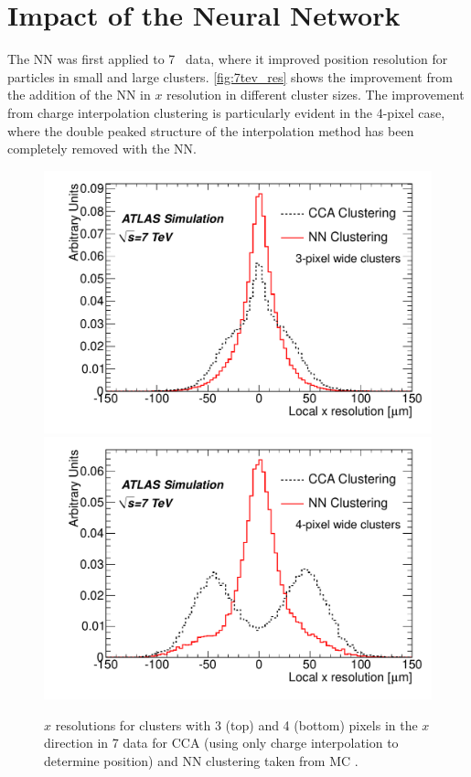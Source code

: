 \section{Impact of the Neural Network}

The \ac{NN} was first applied to 7 \tev~data, where it improved position resolution for particles in small and large clusters. \autoref{fig:7tev_res} shows the improvement from the addition of the \ac{NN} in $x$ resolution in different cluster sizes. The improvement from charge interpolation clustering is particularly evident in the 4-pixel case, where the double peaked structure of the interpolation method has been completely removed with the \ac{NN}.  

\begin{centering}
\begin{figure}[!htb]
\myfloatalign
\includegraphics[width=.9\linewidth]{figures/nn/3x_res.pdf}
\includegraphics[width=.9\linewidth]{figures/nn/4x_res.pdf}
\caption{$x$ resolutions for clusters with 3 (top) and 4 (bottom) pixels in the $x$ direction in 7 \tev data for \ac{CCA} (using only charge interpolation to determine position) and \ac{NN} clustering taken from \ac{MC} \cite{PERF-2012-05}.}
\label{fig:7tev_res}
\end{figure}
\end{centering}

